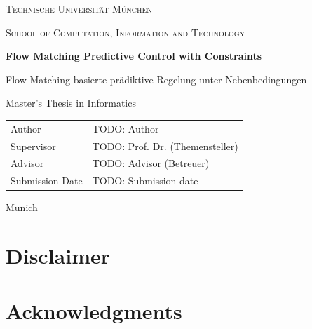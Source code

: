 \documentclass[headsepline,footsepline,footinclude=false,oneside,fontsize=11pt,paper=a4,listof=totoc,bibliography=totoc]{scrbook}
\newcommand*{\getUniversity}{Technische Universität München}
\newcommand*{\getDegree}{Informatics}
\newcommand*{\getSchool}{Computation, Information and Technology}
\newcommand*{\getTitle}{Flow Matching Predictive Control with Constraints}
\newcommand*{\getTitleGer}{Flow-Matching-basierte prädiktive Regelung unter Nebenbedingungen}
\newcommand*{\getAuthor}{TODO: Author}
\newcommand*{\getDoctype}{Master's Thesis in \getDegree}
\newcommand*{\getSupervisor}{TODO: Prof. Dr. (Themensteller)}
\newcommand*{\getAdvisor}{TODO: Advisor (Betreuer)}
\newcommand*{\getSubmissionDate}{TODO: Submission date}
\newcommand*{\getSubmissionLocation}{Munich}
\begin{document}
\ifstandalone
  \begin{titlepage}
    \centering
    \vspace*{2cm}
    {\scshape\LARGE \getUniversity\par}
    \vspace{0.5cm}
    {\scshape\large School of \getSchool\par}
    \vspace{2.5cm}
    {\huge\bfseries \getTitle\par}
    \vspace{1cm}
    {\Large \getTitleGer\par}
    \vspace{2.5cm}
    {\Large \getDoctype\par}
    \vspace{1.5cm}
    \begin{tabular}{ll}
      Author            & \getAuthor            \\
      Supervisor        & \getSupervisor        \\
      Advisor           & \getAdvisor           \\
      Submission Date   & \getSubmissionDate    \\
    \end{tabular}
    \vfill
    {\large \getSubmissionLocation\par}
  \end{titlepage}
\else
  
\fi

\frontmatter{}

\ifstandalone
  \chapter*{Disclaimer}

  \chapter*{Acknowledgments}
\end{document}
